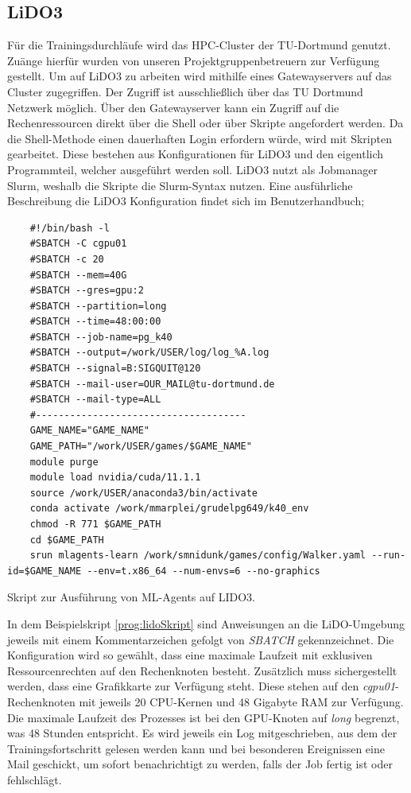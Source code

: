 \subsection{LiDO3}
Für die Trainingsdurchläufe wird das HPC-Cluster der TU-Dortmund genutzt. Zuänge hierfür wurden von unseren Projektgruppenbetreuern zur Verfügung gestellt. Um auf LiDO3 zu arbeiten wird mithilfe eines Gatewayservers auf das Cluster zugegriffen. Der Zugriff ist ausschließlich über das TU Dortmund Netzwerk möglich. Über den Gatewayserver kann ein Zugriff auf die Rechenressourcen direkt über die Shell oder über Skripte angefordert werden. Da die Shell-Methode einen dauerhaften Login erfordern würde, wird mit Skripten gearbeitet. Diese bestehen aus Konfigurationen für LiDO3 und den eigentlich Programmteil, welcher ausgeführt werden soll. LiDO3 nutzt als Jobmanager Slurm, weshalb die Skripte die Slurm-Syntax nutzen. Eine ausführliche Beschreibung die LiDO3 Konfiguration findet sich im Benutzerhandbuch\cite{lido};
\begin{listing}
	\begin{verbatim}
	#!/bin/bash -l
	#SBATCH -C cgpu01
	#SBATCH -c 20
	#SBATCH --mem=40G
	#SBATCH --gres=gpu:2
	#SBATCH --partition=long
	#SBATCH --time=48:00:00
	#SBATCH --job-name=pg_k40
	#SBATCH --output=/work/USER/log/log_%A.log
	#SBATCH --signal=B:SIGQUIT@120
	#SBATCH --mail-user=OUR_MAIL@tu-dortmund.de
	#SBATCH --mail-type=ALL
	#-------------------------------------
	GAME_NAME="GAME_NAME"
	GAME_PATH="/work/USER/games/$GAME_NAME"
	module purge
	module load nvidia/cuda/11.1.1
	source /work/USER/anaconda3/bin/activate
	conda activate /work/mmarplei/grudelpg649/k40_env
	chmod -R 771 $GAME_PATH
	cd $GAME_PATH
	srun mlagents-learn /work/smnidunk/games/config/Walker.yaml --run-id=$GAME_NAME --env=t.x86_64 --num-envs=6 --no-graphics
	\end{verbatim}
	\caption{Skript zur Ausführung von ML-Agents auf LIDO3.}
	\label{prog:lidoSkript}
\end{listing}

In dem Beispielskript \ref{prog:lidoSkript} sind Anweisungen an die LiDO-Umgebung jeweils mit einem Kommentarzeichen gefolgt von \emph{SBATCH} gekennzeichnet. Die Konfiguration wird so gewählt, dass eine maximale Laufzeit mit exklusiven Ressourcenrechten auf den Rechenknoten besteht. Zusätzlich muss sichergestellt werden, dass eine Grafikkarte zur Verfügung steht. Diese stehen auf den \emph{cgpu01}-Rechenknoten mit jeweils 20 CPU-Kernen und 48 Gigabyte RAM zur Verfügung. Die maximale Laufzeit des Prozesses ist bei den GPU-Knoten auf \emph{long} begrenzt, was 48 Stunden entspricht. Es wird jeweils ein Log mitgeschrieben, aus dem der Trainingsfortschritt gelesen werden kann und bei besonderen Ereignissen eine Mail geschickt, um sofort benachrichtigt zu werden, falls der Job fertig ist oder fehlschlägt.

